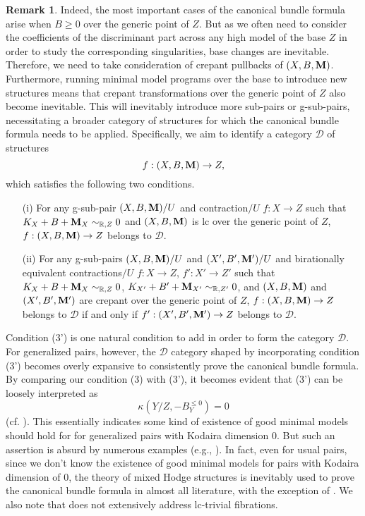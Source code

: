 \documentclass[11pt]{amsart}
\numberwithin{equation}{section}
\newcommand{\Mm}{{\bf{M}}}
\theoremstyle{definition}
\theoremstyle{definition}
\newtheorem{rem}[thm]{Remark}
\theoremstyle{definition}
\begin{document}
\begin{rem}
Indeed, the most important cases of the canonical bundle formula arise when $B\geq 0$ over the generic point of $Z$. But as we often need to consider the coefficients of the discriminant part across any high model of the base $Z$ in order to study the corresponding singularities, base changes are inevitable. Therefore, we need to take consideration of crepant pullbacks of $(X,B,\Mm)$. Furthermore, running minimal model programs over the base to introduce new structures means that crepant transformations over the generic point of $Z$ also become inevitable. This will inevitably introduce more sub-pairs or g-sub-pairs, necessitating a broader category of structures for which the canonical bundle formula needs to be applied. Specifically, we aim to identify a category $\mathcal{D}$ of structures
 $$f: (X,B,\Mm)\rightarrow Z,$$
which satisfies the following two conditions.
\begin{enumerate}
\item[(i)] For any g-sub-pair $(X,B,\Mm)/U$ and contraction$/U$ $f: X\rightarrow Z$ such that $K_X+B+\Mm_X\sim_{\mathbb R,Z}0$ and $(X,B,\Mm)$ is lc over the generic point of $Z$, $f: (X,B,\Mm)\rightarrow Z$ belongs to $\mathcal{D}$.
\item[(ii)] For any g-sub-pairs $(X,B,\Mm)/U$ and $(X',B',\Mm')/U$ and birationally equivalent contractions$/U$ $f: X\rightarrow Z$, $f': X'\rightarrow Z'$ such that $K_X+B+\Mm_X\sim_{\mathbb R,Z}0$, $K_{X'}+B'+\Mm_{X'}\sim_{\mathbb R,Z'}0$, and $(X,B,\Mm)$ and $(X',B',\Mm')$ are crepant over the generic point of $Z$,  $f: (X,B,\Mm)\rightarrow Z$ belongs to $\mathcal{D}$ if and only if  $f': (X',B',\Mm')\rightarrow Z$ belongs to $\mathcal{D}$.
\end{enumerate}
Condition (3') is one natural condition to add in order to form the category $\mathcal{D}$. For generalized pairs, however, the $\mathcal{D}$ category shaped by incorporating condition (3') becomes overly expansive to consistently prove the canonical bundle formula. By comparing our condition (3) with (3'), it becomes evident that (3') can be loosely interpreted as
 $$\kappa(Y/Z,-B_Y^{\leq 0})=0$$
 (cf. \cite[Definitions 8.4.1, 8.4.2]{Kol07}). This essentially indicates some kind of existence of good minimal models should hold for for generalized pairs with Kodaira dimension $0$. But such an assertion is absurd by numerous examples (e.g., \cite[1.1 Example]{Sho00}). In fact, even for usual pairs, since we don't know the existence of good minimal models for pairs with Kodaira dimension of $0$, the theory of mixed Hodge structures is inevitably used to prove the canonical bundle formula in almost all literature, with the exception of \cite{ACSS21}. We also note that \cite{ACSS21} does not extensively address lc-trivial fibrations.


\end{rem}
\end{document}
